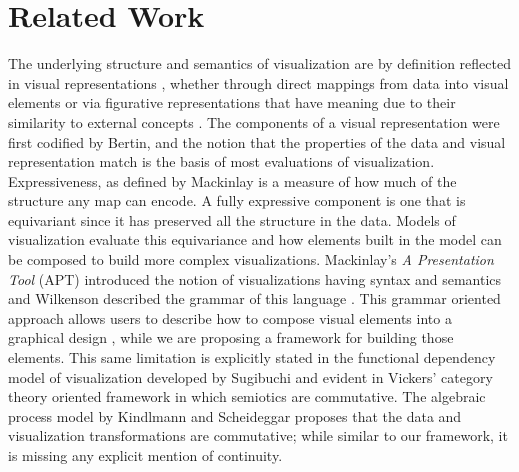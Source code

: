 \documentclass[journal]{vgtc}                %
\begin{document}
\section{Related Work}
The underlying structure and semantics of visualization are by definition reflected in visual representations \cite{friendlyBriefHistoryData2008}, whether through direct mappings from data into visual elements or via figurative representations that have meaning due to their similarity to external concepts \cite{byrneAcquiredCodesMeaning2016}. The components of a visual representation were first codified by Bertin\cite{bertinSemiologyGraphicsDiagrams2011a}, and the notion that the properties of the data and visual representation match is the basis of most evaluations of visualization. Expressiveness, as defined by Mackinlay \cite{mackinlayAUTOMATICDESIGNGRAPHICAL1987, mackinlayAutomatingDesignGraphical1986} is a measure of how much of the structure any map can encode. A fully expressive component is one that is equivariant since it has preserved all the structure in the data. 
Models of visualization evaluate this equivariance and how elements built in the model can be composed to build more complex visualizations. Mackinlay's \textit{A Presentation Tool} (APT) introduced the notion of visualizations having syntax and semantics \cite{mackinlayAutomatingDesignGraphical1986} and Wilkenson described the grammar of this language \cite{wilkinsonGrammarGraphics2005}. This grammar oriented approach allows users to describe how to compose visual elements into a graphical design \cite{wongsuphasawatNavigatingWideWorld2021}, while we are proposing a framework for building those elements. This same limitation is explicitly stated in the functional dependency model of visualization developed by Sugibuchi\cite{sugibuchiFramwork2009} and evident in Vickers' category theory oriented framework in which semiotics are commutative. The algebraic process model by Kindlmann and Scheideggar proposes that the data and visualization transformations are commutative; while similar to our framework, it is missing any explicit mention of continuity. 
\end{document}
